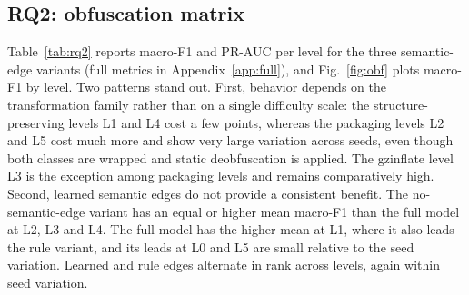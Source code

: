 \documentclass[pdflatex,sn-mathphys-num]{sn-jnl}
\begin{document}
\subsection{RQ2: obfuscation matrix}\label{sec:r-rq2}
Table~\ref{tab:rq2} reports macro-F1 and PR-AUC per level for the three
semantic-edge variants (full metrics in Appendix~\ref{app:full}), and
Fig.~\ref{fig:obf} plots macro-F1 by level. Two patterns stand out. First,
behavior depends on the transformation family rather than on a single
difficulty scale: the structure-preserving levels L1 and L4 cost a few points,
whereas the packaging levels L2 and L5 cost much more and show very large
variation across seeds, even though both classes are wrapped and static
deobfuscation is applied. The gzinflate level L3 is the exception among
packaging levels and remains comparatively high. Second, learned semantic edges
do not provide a consistent benefit. The no-semantic-edge variant has an equal
or higher mean macro-F1 than the full model at L2, L3 and L4. The full model
has the higher mean at L1, where it also leads the rule variant, and its leads
at L0 and L5 are small relative to the seed variation. Learned and rule edges
alternate in rank across levels, again within seed variation.
\end{document}
